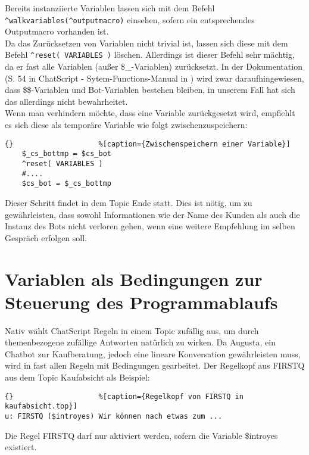 Bereits instanziierte Variablen lassen sich mit dem Befehl \lstinline|^walkvariables(^outputmacro)| einsehen, sofern ein entsprechendes Outputmacro vorhanden ist.\\
Da das Zurücksetzen von Variablen nicht trivial ist, lassen sich diese mit dem Befehl \lstinline|^reset( VARIABLES )| löschen. Allerdings ist dieser Befehl sehr mächtig, da er fast alle Variablen (außer \$\_-Variablen) zurücksetzt. In der Dokumentation (S. 54 in ChatScript - Sytem-Functions-Manual in \citet{chatscript2019}) wird zwar daraufhingewiesen, dass \$\$-Variablen und Bot-Variablen bestehen bleiben, in unserem Fall hat sich das allerdings nicht bewahrheitet.\\
Wenn man verhindern möchte, dass eine Variable zurückgesetzt wird, empfiehlt es sich diese als temporäre Variable wie folgt zwischenzuspeichern:

\begin{lstlisting}{}					%[caption={Zwischenspeichern einer Variable}]
	$_cs_bottmp = $cs_bot
    ^reset( VARIABLES )
    #....
	$cs_bot = $_cs_bottmp 
\end{lstlisting}

Dieser Schritt findet in dem Topic Ende statt. Dies ist nötig, um zu gewährleisten, dass sowohl Informationen wie der Name des Kunden als auch die Instanz des Bots nicht verloren gehen, wenn eine weitere Empfehlung im selben Gespräch erfolgen soll.\\


\section{Variablen als Bedingungen zur Steuerung des Programmablaufs}
\label{sec:ChatScript: Variablen als Bedingungen zur Steuerung von Programmablauf}

Nativ wählt ChatScript Regeln in einem Topic zufällig aus, um durch themenbezogene zufällige Antworten natürlich zu wirken. Da Augusta, ein Chatbot zur Kaufberatung, jedoch eine lineare Konversation gewährleisten muss, wird in fast allen Regeln mit Bedingungen gearbeitet. Der Regelkopf aus FIRSTQ aus dem Topic Kaufabsicht als Beispiel: 

\begin{lstlisting}{}					%[caption={Regelkopf von FIRSTQ in kaufabsicht.top}]
u: FIRSTQ ($introyes) Wir können nach etwas zum ... 
\end{lstlisting}

Die Regel FIRSTQ darf nur aktiviert werden, sofern die Variable \$introyes existiert. 

